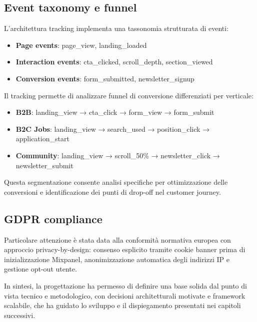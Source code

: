 \subsection{Event taxonomy e funnel}
L'architettura tracking implementa una tassonomia strutturata di eventi:
\begin{itemize}
  \item \textbf{Page events}: page\_view, landing\_loaded
  \item \textbf{Interaction events}: cta\_clicked, scroll\_depth, section\_viewed
  \item \textbf{Conversion events}: form\_submitted, newsletter\_signup
\end{itemize}

Il tracking permette di analizzare funnel di conversione differenziati per verticale:
\begin{itemize}
  \item \textbf{B2B}: landing\_view → cta\_click → form\_view → form\_submit
  \item \textbf{B2C Jobs}: landing\_view → search\_used → position\_click → application\_start
  \item \textbf{Community}: landing\_view → scroll\_50\% → newsletter\_click → newsletter\_submit
\end{itemize}

Questa segmentazione consente analisi specifiche per ottimizzazione delle 
conversioni e identificazione dei punti di drop-off nel customer journey.

\subsection{GDPR compliance}
Particolare attenzione è stata data alla conformità normativa europea con 
approccio privacy-by-design: consenso esplicito tramite cookie banner prima 
di inizializzazione Mixpanel, anonimizzazione automatica degli indirizzi IP 
e gestione opt-out utente.

\bigskip
In sintesi, la progettazione ha permesso di definire una base solida dal punto di
vista tecnico e metodologico, con decisioni architetturali motivate e framework 
scalabile, che ha guidato lo sviluppo e il dispiegamento presentati nei capitoli 
successivi.